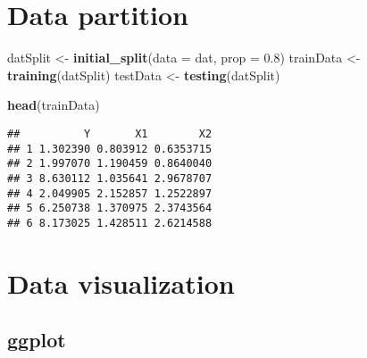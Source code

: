 \documentclass[
]{article}
\newenvironment{Shaded}{\begin{snugshade}}{\end{snugshade}}
\newcommand{\AttributeTok}[1]{\textcolor[rgb]{0.13,0.29,0.53}{#1}}
\newcommand{\FloatTok}[1]{\textcolor[rgb]{0.00,0.00,0.81}{#1}}
\newcommand{\FunctionTok}[1]{\textcolor[rgb]{0.13,0.29,0.53}{\textbf{#1}}}
\newcommand{\NormalTok}[1]{#1}
\newcommand{\OtherTok}[1]{\textcolor[rgb]{0.56,0.35,0.01}{#1}}
\begin{document}
\section{Data partition}\label{data-partition}

\begin{Shaded}
\begin{Highlighting}[]
\NormalTok{datSplit }\OtherTok{\textless{}{-}} \FunctionTok{initial\_split}\NormalTok{(}\AttributeTok{data =}\NormalTok{ dat, }\AttributeTok{prop =} \FloatTok{0.8}\NormalTok{)}
\NormalTok{trainData }\OtherTok{\textless{}{-}} \FunctionTok{training}\NormalTok{(datSplit)}
\NormalTok{testData }\OtherTok{\textless{}{-}} \FunctionTok{testing}\NormalTok{(datSplit)}

\FunctionTok{head}\NormalTok{(trainData)}
\end{Highlighting}
\end{Shaded}

\begin{verbatim}
##          Y       X1        X2
## 1 1.302390 0.803912 0.6353715
## 2 1.997070 1.190459 0.8640040
## 3 8.630112 1.035641 2.9678707
## 4 2.049905 2.152857 1.2522897
## 5 6.250738 1.370975 2.3743564
## 6 8.173025 1.428511 2.6214588
\end{verbatim}

\section{Data visualization}\label{data-visualization}

\subsection{ggplot}\label{ggplot}
\end{document}
